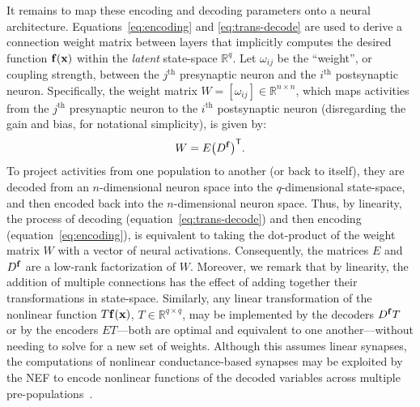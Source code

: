 It remains to map these encoding and decoding parameters onto a neural architecture.
Equations~\ref{eq:encoding} and \ref{eq:trans-decode} are used to derive a connection weight matrix between layers that implicitly computes the desired function $\mathbf{f}(\mathbf{x})$ within the \emph{latent} state-space $\mathbb{R}^q$.
Let $\omega_{ij}$ be the ``weight'', or coupling strength, between the $j^\text{th}$ presynaptic neuron and the $i^\text{th}$ postsynaptic neuron.
Specifically, the weight matrix $W = [\omega_{ij}] \in \mathbb{R}^{n \times n}$, which maps activities from the $j^{\text{th}}$ presynaptic neuron to the $i^{\text{th}}$ postsynaptic neuron (disregarding the gain and bias, for notational simplicity), is given by:
\begin{equation} \label{eq:factored-weights}
W = E {\left(D^{\mathbf{f}}\right)}^\mathsf{T} \text{.}
\end{equation}
To project activities from one population to another (or back to itself), they are decoded from an $n$-dimensional neuron space into the $q$-dimensional state-space, and then encoded back into the $n$-dimensional neuron space.
Thus, by linearity, the process of decoding (equation~\ref{eq:trans-decode}) and then encoding (equation~\ref{eq:encoding}), is equivalent to taking the dot-product of the weight matrix $W$ with a vector of neural activations.
Consequently, the matrices $E$ and $D^{\mathbf{f}}$ are a low-rank factorization of $W$.
Moreover, we remark that by linearity, the addition of multiple connections has the effect of adding together their transformations in state-space. Similarly, any linear transformation of the nonlinear function $T\mathbf{f}(\mathbf{x})$, $T \in \mathbb{R}^{q \times q}$, may be implemented by the decoders $D^{\mathbf{f}}T$ or by the encoders $ET$---both are optimal and equivalent to one another---without needing to solve for a new set of weights.
Although this assumes linear synapses, the computations of nonlinear conductance-based synapses may be exploited by the NEF to encode nonlinear functions of the decoded variables across multiple pre-populations~\citep{stoeckel2018}.

